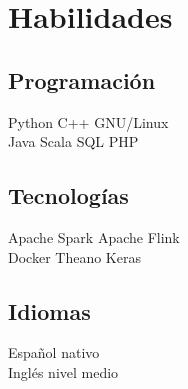 \documentclass[letterpaper]{deedy-resume} %
\begin{document}
\begin{minipage}[t]{0.33\textwidth}
\sectionspace %


\section{Habilidades}

\subsection{Programación}

Python \textbullet{} C++ \textbullet{} GNU/Linux \\
Java \textbullet{} Scala \textbullet{} SQL \textbullet{} PHP

\sectionspace

\subsection{Tecnologías}
Apache Spark \textbullet{} Apache Flink \textbullet{} \\ Docker \textbullet{} Theano \textbullet{} Keras

\sectionspace %

\subsection{Idiomas}
Español nativo\\
Inglés nivel medio


\end{minipage} %
\hfill
%
%
\end{document}

